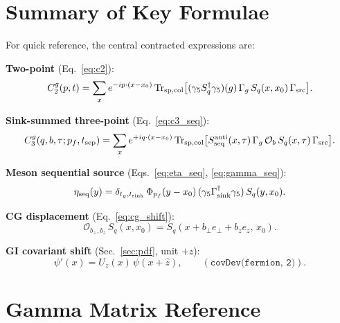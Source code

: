 \documentclass[11pt,a4paper]{article}
\begin{document}
\section{Summary of Key Formulae}
\label{sec:summary_formulae}

For quick reference, the central contracted expressions are:

\medskip\noindent
\textbf{Two-point} (Eq.~\ref{eq:c2}):
\begin{equation*}
  C_2^g(p,t) =
  \sum_x e^{-ip\cdot(x-x_0)}
  \Tr_{\rm sp, col}\!\big[
    (\gamma_5 S_q^\dagger \gamma_5)(g)\, \Gamma_g\, S_q(x,x_0)\, \Gamma_{\rm src}
  \big].
\end{equation*}

\noindent
\textbf{Sink-summed three-point} (Eq.~\ref{eq:c3_seq}):
\begin{equation*}
  C_3^g(q,b,\tau; p_f, t_{\rm sep}) =
  \sum_x e^{+iq\cdot(x-x_0)}
  \Tr_{\rm sp, col}\!\big[
    S_{\rm seq}^{\rm anti}(x,\tau)\, \Gamma_g\,
    \mathcal{O}_b\, S_q(x,\tau)\, \Gamma_{\rm src}
  \big].
\end{equation*}

\noindent
\textbf{Meson sequential source} (Eqs.~\ref{eq:eta_seq}, \ref{eq:gamma_seq}):
\begin{equation*}
  \eta_{\rm seq}(y) =
  \delta_{t_y,t_{\rm sink}}\, \Phi_{p_f}(y-x_0)\,
  (\gamma_5 \Gamma_{\rm sink}^\dagger \gamma_5)\, S_q(y,x_0).
\end{equation*}

\noindent
\textbf{CG displacement} (Eq.~\ref{eq:cg_shift}):
\begin{equation*}
  \mathcal{O}_{b_\perp,b_z}\, S_q(x,x_0) = S_q(x + b_\perp e_\perp + b_z e_z,\, x_0).
\end{equation*}

\noindent
\textbf{GI covariant shift} (Sec.~\ref{sec:pdf}, unit $+z$):
\begin{equation*}
  \psi'(x) = U_z(x)\,\psi(x+\hat{z}),
  \qquad
  (\texttt{covDev(fermion, 2)}).
\end{equation*}


\appendix
\section{Gamma Matrix Reference}
\label{app:gamma}
\end{document}

